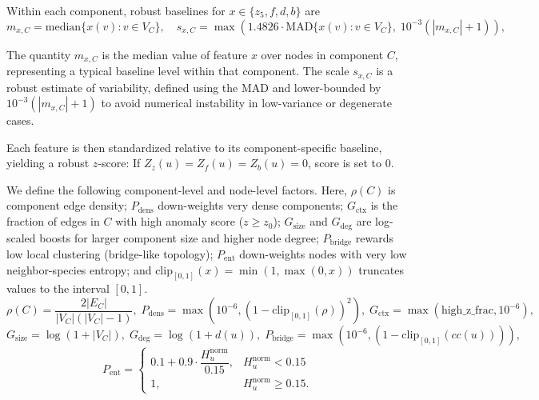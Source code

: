 \documentclass[11pt]{article}
\begin{document}
Within each component, robust baselines for $x\in\{z_5,f,d,b\}$ are
\begin{equation}
m_{x,C}=\mathrm{median}\{x(v):v\in V_C\},\quad
s_{x,C}=\max\!\left(1.4826\cdot \mathrm{MAD}\{x(v):v\in V_C\},\;10^{-3}(|m_{x,C}|+1)\right),
\end{equation}

The quantity $m_{x,C}$ is the median value of feature $x$ over nodes in component $C$, representing a typical baseline level within that component. 
The scale $s_{x,C}$ is a robust estimate of variability, defined using the MAD and lower-bounded by $10^{-3}(|m_{x,C}|+1)$ to avoid numerical instability in low-variance or degenerate cases.

Each feature is then standardized relative to its component-specific baseline, yielding a robust $z$-score:
If $Z_z(u)=Z_f(u)=Z_b(u)=0$, score is set to $0$.
\vspace{0.5em}


We define the following component-level and node-level factors. 
Here, $\rho(C)$ is component edge density; $P_{\mathrm{dens}}$ down-weights very dense components; $G_{\mathrm{ctx}}$ is the fraction of edges in $C$ with high anomaly score ($z\ge z_0$); $G_{\mathrm{size}}$ and $G_{\mathrm{deg}}$ are log-scaled boosts for larger component size and higher node degree; $P_{\mathrm{bridge}}$ rewards low local clustering (bridge-like topology); $P_{\mathrm{ent}}$ down-weights nodes with very low neighbor-species entropy; and $\mathrm{clip}_{[0,1]}(x)=\min(1,\max(0,x))$ truncates values to the interval $[0,1]$.
\begin{equation}
\rho(C)=\frac{2|E_C|}{|V_C|(|V_C|-1)},\;
P_{\mathrm{dens}}=\max(10^{-6},(1-\mathrm{clip}_{[0,1]}(\rho))^{2}),\;
G_{\mathrm{ctx}}=\max(\mathrm{high\_z\_frac},10^{-6}),
\end{equation}
\begin{equation}
G_{\mathrm{size}}=\log(1+|V_C|),\;
G_{\mathrm{deg}}=\log(1+d(u)),\;
P_{\mathrm{bridge}}=\max(10^{-6},(1-\mathrm{clip}_{[0,1]}(cc(u)))),
\end{equation}
\begin{equation}
P_{\mathrm{ent}}=
\begin{cases}
0.1+0.9\cdot \dfrac{H_u^{\mathrm{norm}}}{0.15}, & H_u^{\mathrm{norm}}<0.15\\
1, & H_u^{\mathrm{norm}}\ge 0.15.
\end{cases}
\end{equation}
\end{document}
